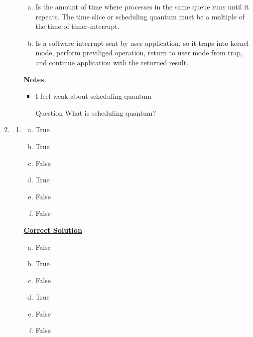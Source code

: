 \documentclass[12pt]{article}
\begin{document}
\begin{enumerate}[1.]
\begin{enumerate}[1)]
\begin{enumerate}[a)]
            \item Is the amount of time where processes in the same queue runs until
            it repeats. The time slice or scheduling quantum must be a multiple of
            the time of timer-interrupt.

            \item Is a software interrupt sent by user application, so it
            traps into kernel mode, perform previliged operation, return to user mode from trap,
            and continue application with the returned result.
        \end{enumerate}

        \bigskip

        \underline{\textbf{Notes}}

        \begin{itemize}
            \item I feel weak about scheduling quantum
            \item [\color{blue}Question\color{black}] What is scheduling quantum?
        \end{itemize}
    \end{enumerate}

    \item

    \begin{enumerate}[1)]
        \item

        \begin{enumerate}[a)]
            \item True
            \item True
            \item False
            \item True
            \item False
            \item False
        \end{enumerate}

        \bigskip

        \begin{mdframed}
        \underline{\textbf{Correct Solution}}

        \bigskip

        \begin{enumerate}[a)]
            \item \color{red}False\color{black}
            \item True
            \item False
            \item True
            \item False
            \item False
        \end{enumerate}


\end{mdframed}
\end{enumerate}
\end{enumerate}
\end{document}
